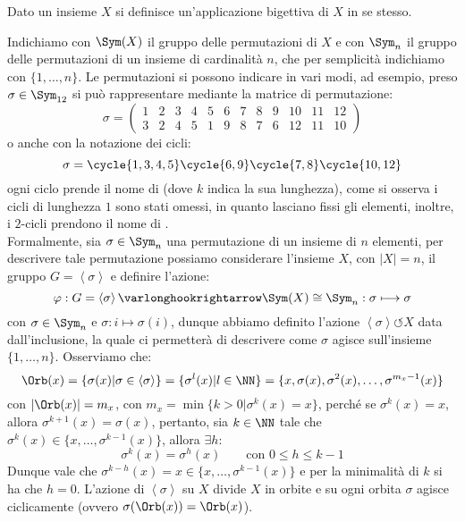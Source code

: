 \documentclass[11pt]{scrartcl}
\begin{document}
\begin{definition}
    Dato un insieme $X$ si definisce  un'applicazione bigettiva di $X$ in se stesso.
\end{definition}

Indichiamo con $\Sym(X)$ il gruppo delle permutazioni di $X$ e con $\Sym_n$ il gruppo delle permutazioni di un insieme di cardinalità $n$, che 
per semplicità indichiamo con $\{1,\ldots,n\}$.
Le permutazioni si possono indicare in vari modi, ad esempio, preso $\sigma \in \Sym_{12}$ si può rappresentare mediante la matrice di permutazione:
    \[ \sigma = \left(\begin{array}{cccccccccccc}
        1 & 2 & 3 & 4 & 5 & 6 & 7 & 8 & 9 & 10 & 11 & 12 \\
        3 & 2 & 4 & 5 & 1 & 9 & 8 & 7 & 6 & 12 & 11 & 10 
        \end{array}\right)
        \]
o anche con la notazione dei cicli:
    \[ \sigma = \cycle{1,3,4,5} \cycle{6,9} \cycle{7,8} \cycle{10,12}
            \]
ogni ciclo prende il nome di  (dove $k$ indica la sua lunghezza), come si osserva i cicli di lunghezza $1$ sono stati omessi,
in quanto lasciano fissi gli elementi, inoltre, i $2$-cicli prendono il nome di .\\
Formalmente, sia $\sigma \in \Sym_n$ una permutazione di un insieme di $n$ elementi, per descrivere tale permutazione
 possiamo considerare l'insieme $X$, con $|X| = n$, il gruppo $G = \left<\sigma\right>$ e definire l'azione:
    \[ \varphi : G = \left<\sigma\right> \varlonghookrightarrow \Sym(X) \cong \Sym_n : \sigma \longmapsto \sigma
        \]
con $\sigma \in \Sym_n$ e $\sigma : i \longmapsto \sigma(i)$, dunque abbiamo definito l'azione $\left<\sigma\right> \circlearrowleft X$ data dall'inclusione, la quale ci permetterà di descrivere come
$\sigma$ agisce sull'insieme $\{1,\ldots,n\}$. Osserviamo che:
    \[ \Orb(x) = \{\sigma(x) | \sigma \in \left<\sigma\right>\} = \{\sigma^l(x) | l \in \NN\} = \{x, \sigma(x), \sigma^2(x),\ldots,\sigma^{m_x-1}(x)\}
        \]
con $|\Orb(x)| = m_x$, con $m_x = \min\{k > 0 | \sigma^k(x) = x\}$, perché se $\sigma^k(x) = x$, allora $\sigma^{k+1}(x) = \sigma(x)$, pertanto, sia $k \in \NN$
tale che $\sigma^k(x) \in \{x,\ldots,\sigma^{k-1}(x)\}$, allora $\exists h:$
    \[ \sigma^k(x) = \sigma^h(x)
    \qquad \text{con $0 \leq h \leq k-1$}
        \]
Dunque vale che $\sigma^{k-h}(x) = x \in \{x,\ldots,\sigma^{k-1}(x)\}$ e per la minimalità di $k$ si ha che $h = 0$.
L'azione di $\left<\sigma\right>$ su $X$ divide $X$ in orbite e su ogni orbita $\sigma$ agisce ciclicamente (ovvero $\sigma(\Orb(x)) = \Orb(x)$).
\end{document}
